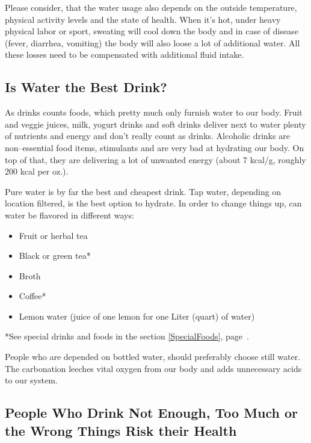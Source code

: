 \documentclass[../main.tex]{subfiles}
\begin{document}
  Please consider, that the water usage also depends on the outside temperature, physical activity levels and the state of health.
  When it's hot, under heavy physical labor or sport, sweating will cool down the body and
  in case of disease (fever, diarrhea, vomiting) the body will also loose a lot of additional water.
  All these losses need to be compensated with additional fluid intake.

  \subsection{Is Water the Best Drink?}

  As drinks counts foods, which pretty much only furnish water to our body. 
  Fruit and veggie juices, milk, yogurt drinks and soft drinks deliver next to water plenty of nutrients and energy and  don't really count as drinks.
  Alcoholic drinks are non--essential food items, stimulants and are very bad at hydrating our body.
  On top of that, they are delivering a lot of unwanted energy (about 7 kcal/g, roughly 200 kcal per oz.).

  
  Pure water is by far the best and cheapest drink. Tap water, depending on location filtered, is the best option to hydrate.
  In order to change things up, can water be flavored in different ways:
  \begin{itemize}
  \item Fruit or herbal tea
  \item Black or green tea* 
  \item Broth
  \item Coffee*
    \item Lemon water (juice of one lemon for one Liter (quart) of water)
  \end{itemize}
{\footnotesize{*See special drinks and foods in the section \ref{SpecialFoods}, page~\pageref{SpecialFoods}.}}
  
People who are depended on bottled water, should preferably choose still water.
  The carbonation leeches vital oxygen from our body and adds unnecessary acids to our system.

  \subsection[Drinking Too Little, Too Much or the Wrong Drinks]{People Who Drink Not Enough, Too Much or the Wrong Things Risk their Health}
\end{document}
